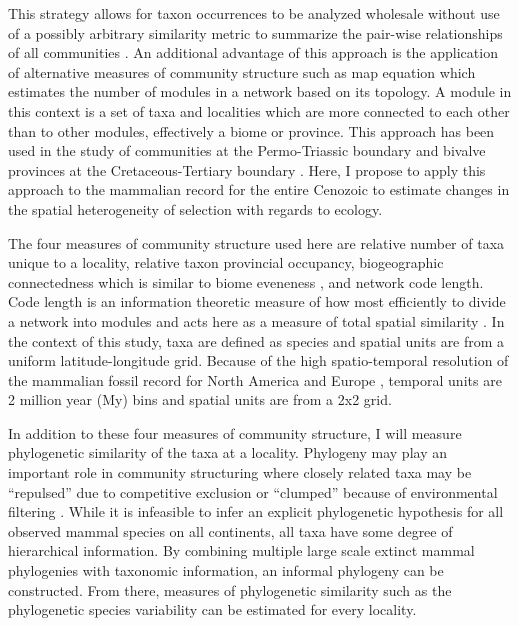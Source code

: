 \documentclass[11pt,letterpaper]{article}
\begin{document}
This strategy allows for taxon occurrences to be analyzed wholesale without use of a possibly arbitrary similarity metric to summarize the pair-wise relationships of all communities \citep{Sidor2013}. An additional advantage of this approach is the application of alternative measures of community structure such as map equation \citep{Rosvall2008,Rosvall2009a} which estimates the number of modules in a network based on its topology. A module in this context is a set of taxa and localities which are more connected to each other than to other modules, effectively a biome or province. This approach has been used in the study of communities at the Permo-Triassic boundary \citep{Sidor2013} and bivalve provinces at the Cretaceous-Tertiary boundary \citep{Vilhena2013}. Here, I propose to apply this approach to the mammalian record for the entire Cenozoic to estimate changes in the spatial heterogeneity of selection with regards to ecology.

The four measures of community structure used here are relative number of taxa unique to a locality, relative taxon provincial occupancy, biogeographic connectedness which is similar to biome eveneness \citep{Sidor2013}, and network code length. Code length is an information theoretic measure of how most efficiently to divide a network into modules and acts here as a measure of total spatial similarity \citep{Rosvall2008,Rosvall2009a}. In the context of this study, taxa are defined as species and spatial units are from a uniform latitude-longitude grid. Because of the high spatio-temporal resolution of the mammalian fossil record for North America and Europe \citep{Alroy2009,Marcot2014,Fortelius2002,Jernvall2004}, temporal units are 2 million year (My) bins and spatial units are from a 2x2 grid.

In addition to these four measures of community structure, I will measure phylogenetic similarity of the taxa at a locality. Phylogeny may play an important role in community structuring where closely related taxa may be ``repulsed'' due to competitive exclusion or ``clumped'' because of environmental filtering \citep{Webb2002}. While it is infeasible to infer an explicit phylogenetic hypothesis for all observed mammal species on all continents, all taxa have some degree of hierarchical information. By combining multiple large scale extinct mammal phylogenies with taxonomic information, an informal phylogeny can be constructed. From there, measures of phylogenetic similarity such as the phylogenetic species variability \citep{Helmus2007a} can be estimated for every locality. 
\end{document}
